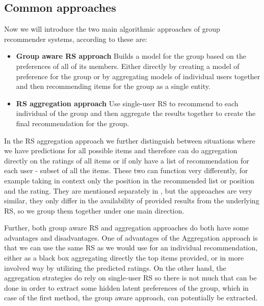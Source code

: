 \subsection{Common approaches}\label{subsec:01_group_rec_sys.common_aproaches}
Now we will introduce the two main algorithmic approaches of group recommender systems, according to \cite{recommendations_to_groups-jameson2007} these are:
\begin{itemize}
    \item \textbf{Group aware RS approach}\newline
    Builds a model for the group based on the preferences of all of its members. Either directly by creating a model of preference for the group or by aggregating models of individual users together and then recommending items for the group as a single entity.
    \item \textbf{RS aggregation approach}\newline
    Use single-user RS to recommend to each individual of the group and then aggregate the results together to create the final recommendation for the group.
    
\end{itemize}


In the RS aggregation approach we further distinguish between situations where we have predictions for all possible items and therefore can do aggregation directly on the ratings of all items or if only have a list of recommendation for each user - subset of all the items. These two can function very differently, for example taking in context only the position in the recommended list or position and the rating. They are mentioned separately in \cite{recommendations_to_groups-jameson2007}, but the approaches are very similar, they only differ in the availability of provided results from the underlying RS, so we group them together under one main direction.

Further, both group aware RS and aggregation approaches do both have some advantages and disadvantages. One of advantages of the Aggregation approach is that we can use the same RS as we would use for an individual recommendation, either as a black box aggregating directly the top items provided, or in more involved way by utilizing the predicted ratings. On the other hand, the aggregation strategies do rely on single-user RS so there is not much that can be done in order to extract some hidden latent preferences of the group, which in case of the first method, the group aware approach, can potentially be extracted.


